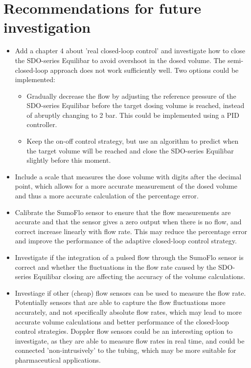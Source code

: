 \documentclass[12pt,a4paper]{article}
\begin{document}
\section{Recommendations for future investigation}
\label{sec:recommendations}
\begin{itemize}
    \item Add a chapter 4 about 'real closed-loop control' and investigate how to close the SDO-series Equilibar to avoid overshoot in the dosed volume. The semi-closed-loop approach does not work sufficiently well. Two options could be implemented:
    \begin{itemize}
        \item Gradually decrease the flow by adjusting the reference pressure of the SDO-series Equilibar before the target dosing volume is reached, instead of abruptly changing to 2 bar. This could be implemented using a PID controller.
        \item Keep the on-off control strategy, but use an algorithm to predict when the target volume will be reached and close the SDO-series Equilibar slightly before this moment.
    \end{itemize}
    \item Include a scale that measures the dose volume with digits after the decimal point, which allows for a more accurate measurement of the dosed volume and thus a more accurate calculation of the percentage error.
    \item Calibrate the SumoFlo sensor to ensure that the flow measurements are accurate and that the sensor gives a zero output when there is no flow, and correct increase linearly with flow rate. This may reduce the percentage error and improve the performance of the adaptive closed-loop control strategy.
    \item Investigate if the integration of a pulsed flow through the SumoFlo sensor is correct and whether the fluctuations in the flow rate caused by the SDO-series Equilibar closing are affecting the accuracy of the volume calculations.
    \item Investiage if other (cheap) flow sensors can be used to measure the flow rate. Potentially sensors that are able to capture the flow fluctuations more accurately, and not specifically absolute flow rates, which may lead to more accurate volume calculations and better performance of the closed-loop control strategies. Doppler flow sensors could be an interesting option to investigate, as they are able to measure flow rates in real time, and could be connected 'non-intrusively' to the tubing, which may be more suitable for pharmaceutical applications.
\end{itemize}
\end{document}
